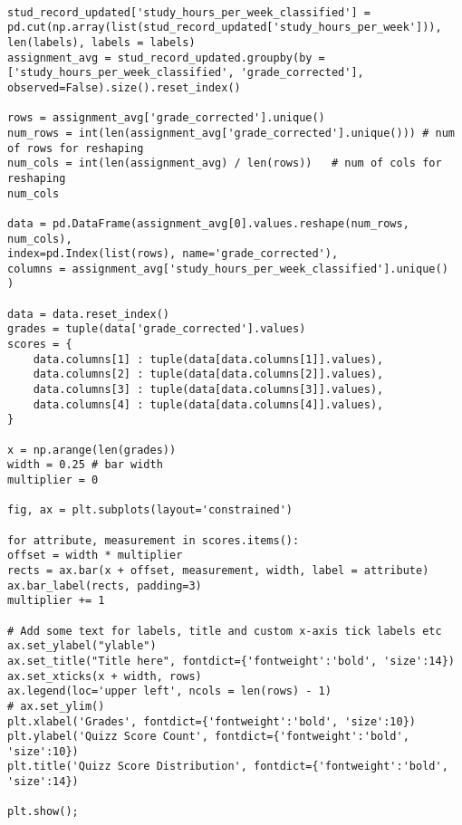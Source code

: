\label{code:grade_department}
\begin{verbatim}
	
stud_record_updated['study_hours_per_week_classified'] = pd.cut(np.array(list(stud_record_updated['study_hours_per_week'])), len(labels), labels = labels)
assignment_avg = stud_record_updated.groupby(by = ['study_hours_per_week_classified', 'grade_corrected'], observed=False).size().reset_index()

rows = assignment_avg['grade_corrected'].unique()
num_rows = int(len(assignment_avg['grade_corrected'].unique())) # num of rows for reshaping
num_cols = int(len(assignment_avg) / len(rows))   # num of cols for reshaping
num_cols

data = pd.DataFrame(assignment_avg[0].values.reshape(num_rows, num_cols), 
index=pd.Index(list(rows), name='grade_corrected'),
columns = assignment_avg['study_hours_per_week_classified'].unique()
)

data = data.reset_index()
grades = tuple(data['grade_corrected'].values)
scores = {
	data.columns[1] : tuple(data[data.columns[1]].values),
	data.columns[2] : tuple(data[data.columns[2]].values),
	data.columns[3] : tuple(data[data.columns[3]].values),
	data.columns[4] : tuple(data[data.columns[4]].values),
}

x = np.arange(len(grades))
width = 0.25 # bar width
multiplier = 0

fig, ax = plt.subplots(layout='constrained')

for attribute, measurement in scores.items():
offset = width * multiplier 
rects = ax.bar(x + offset, measurement, width, label = attribute)
ax.bar_label(rects, padding=3)
multiplier += 1

# Add some text for labels, title and custom x-axis tick labels etc
ax.set_ylabel("ylable")
ax.set_title("Title here", fontdict={'fontweight':'bold', 'size':14})
ax.set_xticks(x + width, rows)
ax.legend(loc='upper left', ncols = len(rows) - 1)
# ax.set_ylim()
plt.xlabel('Grades', fontdict={'fontweight':'bold', 'size':10})
plt.ylabel('Quizz Score Count', fontdict={'fontweight':'bold', 'size':10})
plt.title('Quizz Score Distribution', fontdict={'fontweight':'bold', 'size':14})

plt.show();
	
\end{verbatim}


